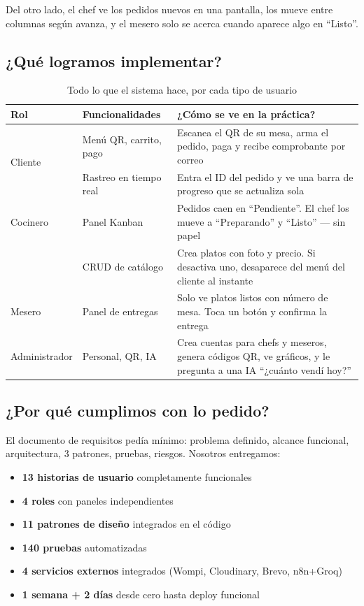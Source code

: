 \documentclass[12pt,a4paper]{article}
\begin{document}
Del otro lado, el chef ve los pedidos nuevos en una pantalla, los mueve entre columnas según avanza, y el mesero solo se acerca cuando aparece algo en ``Listo''.

\subsection{¿Qué logramos implementar?}

\begin{table}[H]
\centering
{}
\small
\begin{tabular}{p{2.2cm} p{4cm} p{6.5cm}}
\toprule
\rowcolor{daniel!20}\textbf{Rol} & \textbf{Funcionalidades} & \textbf{¿Cómo se ve en la práctica?} \\
\midrule
\multirow{2}{*}{Cliente} & Menú QR, carrito, pago & Escanea el QR de su mesa, arma el pedido, paga y recibe comprobante por correo \\
& Rastreo en tiempo real & Entra el ID del pedido y ve una barra de progreso que se actualiza sola \\
Cocinero & Panel Kanban & Pedidos caen en ``Pendiente''. El chef los mueve a ``Preparando'' y ``Listo'' — sin papel \\
& CRUD de catálogo & Crea platos con foto y precio. Si desactiva uno, desaparece del menú del cliente al instante \\
Mesero & Panel de entregas & Solo ve platos listos con número de mesa. Toca un botón y confirma la entrega \\
Administrador & Personal, QR, IA & Crea cuentas para chefs y meseros, genera códigos QR, ve gráficos, y le pregunta a una IA ``¿cuánto vendí hoy?'' \\
\bottomrule
\end{tabular}
\caption{Todo lo que el sistema hace, por cada tipo de usuario}
\end{table}

\subsection{¿Por qué cumplimos con lo pedido?}

El documento de requisitos pedía mínimo: problema definido, alcance funcional, arquitectura, 3 patrones, pruebas, riesgos. Nosotros entregamos:

\begin{itemize}[itemsep=2pt]
  \item \textbf{13 historias de usuario} completamente funcionales
  \item \textbf{4 roles} con paneles independientes
  \item \textbf{11 patrones de diseño} integrados en el código
  \item \textbf{140 pruebas} automatizadas
  \item \textbf{4 servicios externos} integrados (Wompi, Cloudinary, Brevo, n8n+Groq)
  \item \textbf{1 semana + 2 días} desde cero hasta deploy funcional
\end{itemize}
\end{document}
